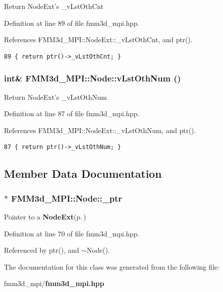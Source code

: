 Return Node\-Ext's \_\-v\-Lst\-Oth\-Cnt 

Definition at line 89 of file fmm3d\_\-mpi.hpp.

References FMM3d\_\-MPI::Node\-Ext::\_\-v\-Lst\-Oth\-Cnt, and ptr().

\footnotesize\begin{verbatim}89 { return ptr()->_vLstOthCnt; }
\end{verbatim}\normalsize 


\subsubsection{\setlength{\rightskip}{0pt plus 5cm}int\& FMM3d\_\-MPI::Node::v\-Lst\-Oth\-Num ()\hspace{0.3cm}{\tt  [inline]}}\label{classFMM3d__MPI_1_1Node_53899edcedfb6ca020d4d55a9c6a62f8_53899edcedfb6ca020d4d55a9c6a62f8}


Return Node\-Ext's \_\-v\-Lst\-Oth\-Num 

Definition at line 87 of file fmm3d\_\-mpi.hpp.

References FMM3d\_\-MPI::Node\-Ext::\_\-v\-Lst\-Oth\-Num, and ptr().

\footnotesize\begin{verbatim}87 { return ptr()->_vLstOthNum; }
\end{verbatim}\normalsize 




\subsection{Member Data Documentation}
\subsubsection{$\ast$ {\bf FMM3d\_\-MPI::Node::\_\-ptr}\hspace{0.3cm}{\tt  [protected]}}\label{classFMM3d__MPI_1_1Node_ed0cfb365dac6bfe43badc9baabeacee_ed0cfb365dac6bfe43badc9baabeacee}


Pointer to a {\bf Node\-Ext}{\rm (p.\,\pageref{classFMM3d__MPI_1_1NodeExt})} 

Definition at line 70 of file fmm3d\_\-mpi.hpp.

Referenced by ptr(), and $\sim$Node().

The documentation for this class was generated from the following file:\begin{CompactItemize}
\item 
fmm3d\_\-mpi/{\bf fmm3d\_\-mpi.hpp}\end{CompactItemize}
